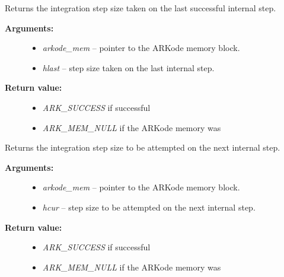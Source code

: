 \documentclass[letterpaper,10pt,english]{sphinxmanual}
\begin{document}
\begin{fulllineitems}
\label{c_interface/User_callable:c.ARKodeGetLastStep}
Returns the integration step size taken on the last successful
internal step.
\begin{description}
\item[{\textbf{Arguments:}}] \leavevmode\begin{itemize}
\item {} 
\emph{arkode\_mem} -- pointer to the ARKode memory block.

\item {} 
\emph{hlast} -- step size taken on the last internal step.

\end{itemize}

\item[{\textbf{Return value:}}] \leavevmode\begin{itemize}
\item {} 
\emph{ARK\_SUCCESS} if successful

\item {} 
\emph{ARK\_MEM\_NULL} if the ARKode memory was 

\end{itemize}

\end{description}

\end{fulllineitems}


\begin{fulllineitems}
\label{c_interface/User_callable:c.ARKodeGetCurrentStep}
Returns the integration step size to be attempted on the next internal step.
\begin{description}
\item[{\textbf{Arguments:}}] \leavevmode\begin{itemize}
\item {} 
\emph{arkode\_mem} -- pointer to the ARKode memory block.

\item {} 
\emph{hcur} -- step size to be attempted on the next internal step.

\end{itemize}

\item[{\textbf{Return value:}}] \leavevmode\begin{itemize}
\item {} 
\emph{ARK\_SUCCESS} if successful

\item {} 
\emph{ARK\_MEM\_NULL} if the ARKode memory was 

\end{itemize}

\end{description}

\end{fulllineitems}
\end{document}
